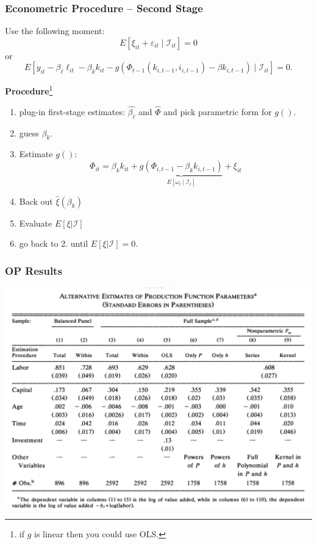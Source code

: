 \documentclass[11pt, aspectratio=169]{beamer}
\newenvironment{wideitemize}{\itemize\addtolength{\itemsep}{10pt}}{\enditemize}
\begin{document}
\begin{frame}[c]\frametitle{Econometric Procedure -- Second Stage}
    
\begin{wideitemize}
	\item Use the following moment:
	$$E[\xi_{it} + \varepsilon_{it} \mid \mathcal{I}_{it}] = 0$$
	or 
	$$E[y_{it} - \beta_{\ell} \ell_{it} - \beta_k k_{it} - g(\Phi_{t-1}(k_{i,t-1},i_{i,t-1})-\beta k_{i,t-1}) \mid \mathcal{I}_{it}] = 0.$$
\end{wideitemize}

\bigskip
\textbf{Procedure}\footnote{if $g$ is linear then you could use OLS.}

\begin{enumerate}
	\item plug-in first-stage estimates: $\hat{\beta_{\ell}}$ and $\hat{\Phi}$ and pick parametric form for $g()$.
	\item guess $\beta_k$.
	\item Estimate $g()$: 
	$$ \Phi_{it} = \beta_k k_{it} + \underbrace{g(\Phi_{i,t-1} - \beta_k k_{i,t-1})}_{E[\omega_t \mid \mathcal{I}_t]} + \xi_{it}$$
	\item Back out $\hat{\xi}(\beta_k)$
	\item Evaluate $E[\xi|\mathcal{I}]$
	\item go back to 2. until $E[\xi|\mathcal{I}]=0$.
\end{enumerate}

\end{frame}



\begin{frame}[c]\frametitle{OP Results}
    
\centering
\includegraphics[height=0.9\textheight]{OPTable6.png}


\end{frame}
\end{document}
